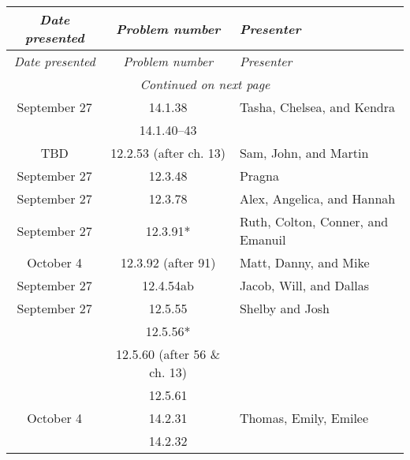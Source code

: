 \documentclass[12pt]{amsart}
\begin{document}
    \begin{longtable}{c|c|l}
        \emph{Date presented} &\emph{Problem number} & \emph{Presenter} \\ \hline
        \endfirsthead
        \emph{Date presented} & \emph{Problem number} & \emph{Presenter} \\ \hline
        \endhead
        \hline
        \multicolumn{3}{c}{\emph{Continued on next page}} \\
        \endfoot
        \hline 
        \endlastfoot
        September 27    & 14.1.38                              & Tasha, Chelsea, and Kendra               \\
                        & 14.1.40--43                          &                                          \\
        TBD             & 12.2.53 (after ch. 13)               & Sam, John, and Martin                    \\
        September 27    & 12.3.48                              & Pragna                                   \\
        September 27    & 12.3.78                              & Alex, Angelica, and Hannah               \\
        September 27    & 12.3.91*                             & Ruth, Colton, Conner, and Emanuil        \\
        October 4       & 12.3.92 (after 91)                   & Matt, Danny, and Mike                    \\
        September 27    & 12.4.54ab                            & Jacob, Will, and Dallas                  \\
        September 27    & 12.5.55                              & Shelby and Josh                          \\
                        & 12.5.56*                             &                                          \\
                        & 12.5.60 (after 56 \& ch. 13)         &                                          \\
                        & 12.5.61                              &                                          \\
        October 4       & 14.2.31                              & Thomas, Emily, Emilee                    \\
                        & 14.2.32                              &                                          \\

\end{longtable}
\end{document}
